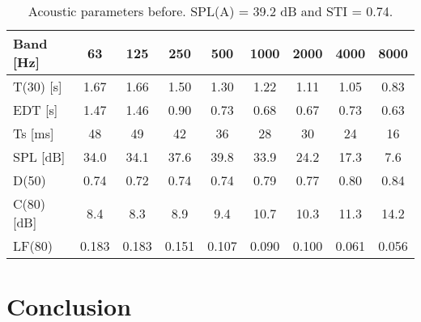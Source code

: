 \begin{table}[htdp]
\begin{center}\begin{tabular}{lcccccccc}
Band [Hz]   &       63    &   125   &    250    &   500  &    1000   &   2000   &   4000  & 8000 \\
\hline
T(30)  [s]   &   1.67    &  1.66  &    1.50     & 1.30   &   1.22   &   1.11   &   1.05  &    0.83  \\
EDT    [s]   &   1.47   &   1.46  &    0.90   &   0.73   &   0.68   &   0.67   &   0.73   &   0.63   \\
Ts     [ms] &  48   &     49   &     42  &      36   &     28   &     30   &     24   &     16        \\
SPL    [dB] &   34.0   &   34.1  &    37.6   &   39.8   &   33.9  &    24.2   &   17.3   &    7.6     \\
D(50)       &  0.74   &   0.72  &    0.74    &  0.74    &  0.79     & 0.77   &   0.80   &   0.84   \\
C(80)  [dB]  &   8.4   &    8.3   &    8.9   &    9.4   &   10.7   &   10.3   &   11.3  &    14.2     \\
LF(80)    &      0.183 &    0.183  &   0.151  &   0.107  &   0.090  &   0.100   &  0.061   &  0.056
\end{tabular} 
\caption{Acoustic parameters before. SPL(A) = 39.2 dB and STI = 0.74.}
\end{center}
\label{tab:after}
\end{table}



\newpage
\section{Conclusion} %
\label{sec:conclusion}

